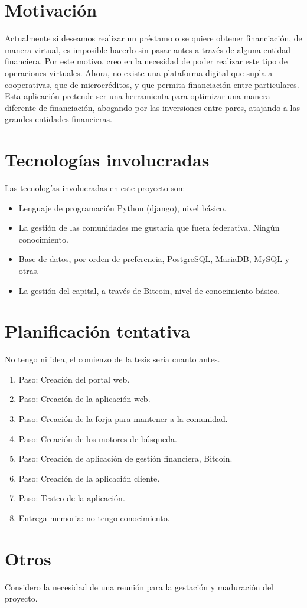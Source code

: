 \documentclass[10pt]{article}
\begin{document}
\section{Motivación}

Actualmente si deseamos realizar un préstamo o se quiere obtener financiación, de manera virtual, es imposible hacerlo sin pasar antes a través de alguna entidad financiera. Por este motivo, creo en la necesidad de poder realizar este tipo de operaciones virtuales. Ahora, no existe una plataforma digital que supla a cooperativas, que de microcréditos, y que permita financiación entre particulares. Esta aplicación pretende ser una herramienta para optimizar una manera diferente de financiación, abogando por las inversiones entre pares, atajando a las grandes entidades financieras.

\section{Tecnologías involucradas}

Las tecnologías involucradas en este proyecto son:

\begin{itemize}
  \item Lenguaje de programación Python (django), nivel básico.
  \item La gestión de las comunidades me gustaría que fuera federativa. Ningún conocimiento.
  \item Base de datos, por orden de preferencia, PostgreSQL, MariaDB, MySQL y otras.
  \item La gestión del capital, a través de Bitcoin, nivel de conocimiento básico.
\end{itemize}

\section{Planificación tentativa}

No tengo ni idea, el comienzo de la tesis sería cuanto antes.

\begin{enumerate}
  \item Paso: Creación del portal web.
  \item Paso: Creación de la aplicación web.
  \item Paso: Creación de la forja para mantener a la comunidad.
  \item Paso: Creación de los motores de búsqueda.
  \item Paso: Creación de aplicación de gestión financiera, Bitcoin. 
  \item Paso: Creación de la aplicación cliente.
  \item Paso: Testeo de la aplicación.
  \item Entrega memoria: no tengo conocimiento.
\end{enumerate}

\section{Otros}

Considero la necesidad de una reunión para la gestación y maduración del proyecto.  
\end{document}
